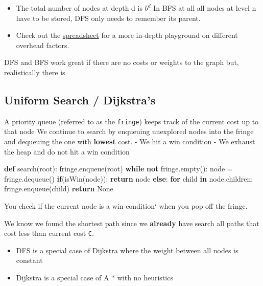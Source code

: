 \documentclass[
  letterpaper,
  DIV=11,
  numbers=noendperiod]{scrartcl}
\newenvironment{Shaded}{\begin{snugshade}}{\end{snugshade}}
\newcommand{\ControlFlowTok}[1]{\textcolor[rgb]{0.00,0.23,0.31}{\textbf{#1}}}
\newcommand{\KeywordTok}[1]{\textcolor[rgb]{0.00,0.23,0.31}{\textbf{#1}}}
\newcommand{\NormalTok}[1]{\textcolor[rgb]{0.00,0.23,0.31}{#1}}
\newcommand{\OperatorTok}[1]{\textcolor[rgb]{0.37,0.37,0.37}{#1}}
\newcommand{\VariableTok}[1]{\textcolor[rgb]{0.07,0.07,0.07}{#1}}
\providecommand{\tightlist}{%
  \setlength{\itemsep}{0pt}\setlength{\parskip}{0pt}}\usepackage{longtable,booktabs,array}
\begin{document}
\begin{itemize}
\tightlist
\item
  The total number of nodes at depth d is \(b ^ d\) In BFS at all all
  nodes at level n have to be stored, DFS only needs to remember its
  parent.
\item
  Check out the \href{}{spreadsheet} for a more in-depth playground on
  different overhead factors.
\end{itemize}

DFS and BFS work great if there are no costs or weights to the graph
but, realistically there is

\subsection{Uniform Search / Dijkstra's}\label{uniform-search-dijkstras}

A priority queue (referred to as the \texttt{fringe}) keeps track of the
current cost up to that node We continue to search by enqueuing
unexplored nodes into the fringe and dequeuing the one with
\textbf{lowest} cost. - We hit a win condition - We exhaust the heap and
do not hit a win condition

\begin{Shaded}
\begin{Highlighting}[]
\KeywordTok{def}\NormalTok{ search(root):}
\NormalTok{  fringe.enqueue(root)}
  \ControlFlowTok{while} \KeywordTok{not}\NormalTok{ fringe.empty():}
\NormalTok{    node }\OperatorTok{=}\NormalTok{ fringe.dequeue()}
    \ControlFlowTok{if}\NormalTok{(isWin(node)):}
      \ControlFlowTok{return}\NormalTok{ node}
    \ControlFlowTok{else}\NormalTok{:}
      \ControlFlowTok{for}\NormalTok{ child }\KeywordTok{in}\NormalTok{ node.children:}
\NormalTok{        fringe.enqueue(child)}
  \ControlFlowTok{return} \VariableTok{None}
\end{Highlighting}
\end{Shaded}

You check if the current node is a win condition` when you pop off the
fringe.

We know we found the shortest path since we \textbf{already} have search
all paths that cost less than current cost \texttt{C}.

\begin{tcolorbox}[enhanced jigsaw, opacitybacktitle=0.6, title=\textcolor{quarto-callout-note-color}{\faInfo}\hspace{0.5em}{Note}, toptitle=1mm, left=2mm, breakable, titlerule=0mm, bottomtitle=1mm, bottomrule=.15mm, leftrule=.75mm, colframe=quarto-callout-note-color-frame, arc=.35mm, rightrule=.15mm, toprule=.15mm, coltitle=black, colback=white, opacityback=0, colbacktitle=quarto-callout-note-color!10!white]

\begin{itemize}
\tightlist
\item
  DFS is a special case of Dijkstra where the weight between all nodes
  is constant
\item
  Dijkstra is a special case of A * with no heuristics
\end{itemize}

\end{tcolorbox}
\end{document}
